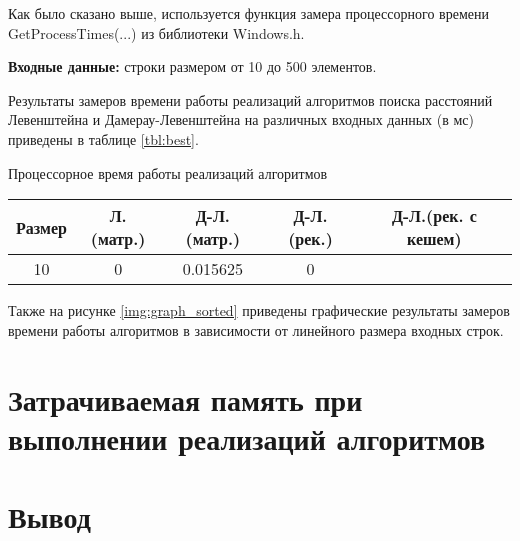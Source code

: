 Как было сказано выше, используется функция замера процессорного времени GetProcessTimes(...) из библиотеки Windows.h. 

\textbf{Входные данные:} строки размером от 10 до 500 элементов.

Результаты замеров времени работы реализаций алгоритмов поиска расстояний Левенштейна и Дамерау-Левенштейна на различных входных данных (в мс) приведены в таблице \ref{tbl:best}.


\begin{center}
	\begin{threeparttable}
		\caption{Процессорное время работы реализаций алгоритмов}
		\label{tbl:best}
		\begin{tabular}{|c|c|c|c|c|}
			\hline
			Размер & Л.(матр.) &  Д-Л.(матр.)  &  Д-Л.(рек.)& Д-Л.(рек. с кешем)\\
			\hline
			10 & 0  &  0.015625 &0 & \\ 
			\hline
		
		\end{tabular}
		
	\end{threeparttable}
\end{center}
Также на рисунке \ref{img:graph_sorted} приведены графические результаты замеров времени работы алгоритмов в зависимости от линейного размера входных строк.

\begin{center}
	\label{img:graph_sorted}
\end{center}
\newpage

\section{Затрачиваемая память при выполнении реализаций алгоритмов}

\section{Вывод}
